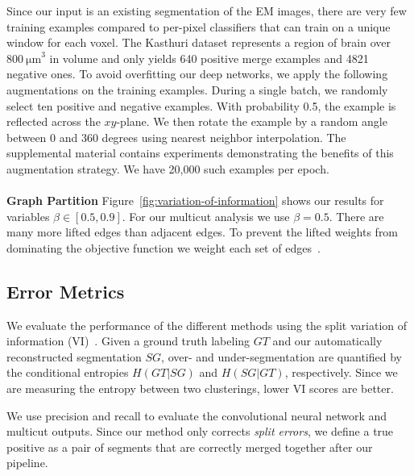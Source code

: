 Since our input is an existing segmentation of the EM images, there are very few training examples compared to per-pixel classifiers that can train on a unique window for each voxel. 
The Kasthuri dataset represents a region of brain over $\SI[product-units=single]{800}{\micro\meter}^3$ in volume and only yields 640 positive merge examples and 4821 negative ones.
To avoid overfitting our deep networks, we apply the following augmentations on the training examples.
During a single batch, we randomly select ten positive and negative examples. 
With probability 0.5, the example is reflected across the $xy$-plane. 
We then rotate the example by a random angle between $0$ and $360$ degrees using nearest neighbor interpolation. 
The supplemental material contains experiments demonstrating the benefits of this augmentation strategy.
We have 20,000 such examples per epoch.
\\~\\
\noindent\textbf{Graph Partition}
Figure~\ref{fig:variation-of-information} shows our results for variables $\beta \in [0.5, 0.9]$. 
For our multicut analysis we use $\beta = 0.5$. There are many more lifted edges than adjacent edges. 
To prevent the lifted weights from dominating the objective function we weight each set of edges~\cite{beier2017multicut}.

\subsection{Error Metrics}
\label{sec:variation-of-information}
We evaluate the performance of the different methods using the split variation of information (VI)~\cite{meila2003comparing}.
Given a ground truth labeling $GT$ and our automatically reconstructed segmentation $SG$, over- and under-segmentation are quantified by the conditional entropies $H(GT | SG)$ and $H(SG | GT)$, respectively. 
Since we are measuring the entropy between two clusterings, lower VI scores are better.

We use precision and recall to evaluate the convolutional neural network and multicut outputs. 
Since our method only corrects \textit{split errors}, we define a true positive as a pair of segments that are correctly merged together after our pipeline.
